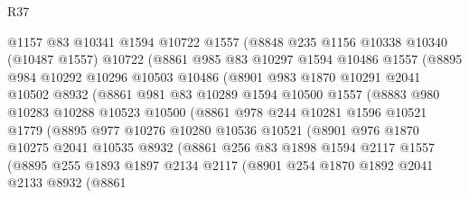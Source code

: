 \begin{lexlean}{R37}
\begin{coremodule}
            @1157
            @83
            @10341
            @1594
            @10722
            @1557
            (@8848
              @235
              @1156
              @10338
              @10340
              (@10487 @1557)
              @10722
              (@8861
                @985
                @83
                @10297
                @1594
                @10486
                @1557
                (@8895
                  @984
                  @10292
                  @10296
                  @10503
                  @10486
                  (@8901
                    @983
                    @1870
                    @10291
                    @2041
                    @10502
                    @8932
                    (@8861
                      @981
                      @83
                      @10289
                      @1594
                      @10500
                      @1557
                      (@8883
                        @980
                        @10283
                        @10288
                        @10523
                        @10500
                        (@8861
                          @978
                          @244
                          @10281
                          @1596
                          @10521
                          @1779
                          (@8895
                            @977
                            @10276
                            @10280
                            @10536
                            @10521
                            (@8901
                              @976
                              @1870
                              @10275
                              @2041
                              @10535
                              @8932
                              (@8861
                                @256
                                @83
                                @1898
                                @1594
                                @2117
                                @1557
                                (@8895
                                  @255
                                  @1893
                                  @1897
                                  @2134
                                  @2117
                                  (@8901
                                    @254
                                    @1870
                                    @1892
                                    @2041
                                    @2133
                                    @8932
                                    (@8861

\end{coremodule}
\end{lexlean}
